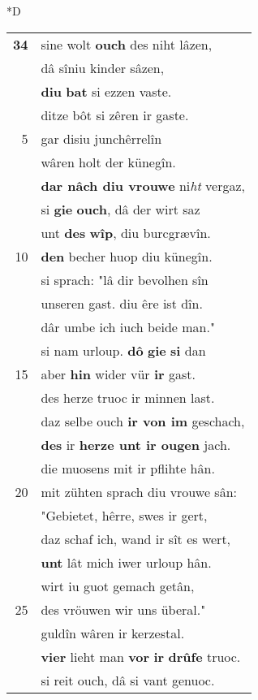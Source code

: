 \documentclass[8pt,a4paper,notitlepage]{article}
\begin{document}
\begin{table}[ht]
\begin{minipage}[t]{0.5\linewidth}
\small
\begin{center}*D
\end{center}
\begin{tabular}{rl}
\textbf{34} & sine wolt \textbf{ouch} des niht lâzen,\\ 
 & dâ sîniu kinder sâzen,\\ 
 & \textbf{diu} \textbf{bat} si ezzen vaste.\\ 
 & ditze bôt si zêren ir gaste.\\ 
5 & gar disiu junchêrrelîn\\ 
 & wâren holt der künegîn.\\ 
 & \textbf{dar nâch diu vrouwe} ni\textit{ht} vergaz,\\ 
 & si \textbf{gie} \textbf{ouch}, dâ der wirt saz\\ 
 & unt \textbf{des} \textbf{wîp}, diu burcgrævîn.\\ 
10 & \textbf{den} becher huop diu künegîn.\\ 
 & si sprach: "lâ dir bevolhen sîn\\ 
 & unseren gast. diu êre ist dîn.\\ 
 & dâr umbe ich iuch beide man."\\ 
 & si nam urloup. \textbf{dô} \textbf{gie} \textbf{si} dan\\ 
15 & aber \textbf{hin} wider vür \textbf{ir} gast.\\ 
 & des herze truoc ir minnen last.\\ 
 & daz selbe ouch \textbf{ir von im} geschach,\\ 
 & \textbf{des} ir \textbf{herze unt ir ougen} jach.\\ 
 & die muosens mit ir pflihte hân.\\ 
20 & mit zühten sprach diu vrouwe sân:\\ 
 & "Gebietet, hêrre, swes ir gert,\\ 
 & daz schaf ich, wand ir sît es wert,\\ 
 & \textbf{unt} lât mich iwer urloup hân.\\ 
 & wirt iu guot gemach getân,\\ 
25 & des vröuwen wir uns überal."\\ 
 & guldîn wâren ir kerzestal.\\ 
 & \textbf{vier} lieht man \textbf{vor} \textbf{ir} \textbf{drûfe} truoc.\\ 
 & si reit ouch, dâ si vant genuoc.\\ 

\end{tabular}
\end{minipage}
\end{table}
\end{document}
